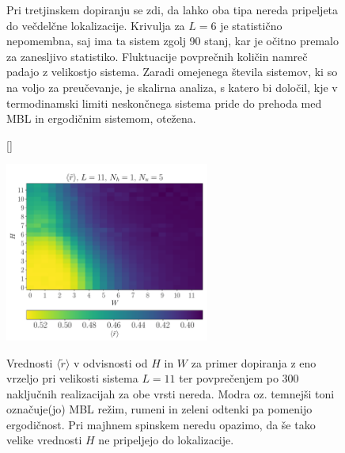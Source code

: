 \begin{figure}[H]
\caption{Pri tretjinskem dopiranju se zdi, da lahko oba tipa nereda pripeljeta do večdelčne lokalizacije. Krivulja za $L=6$ je statistično nepomembna, saj ima ta sistem zgolj 90 stanj, kar je očitno premalo za zanesljivo statistiko. Fluktuacije povprečnih količin namreč padajo z velikostjo sistema. Zaradi omejenega števila sistemov, ki so na voljo za preučevanje, je skalirna analiza, s katero bi določil, kje v termodinamski limiti neskončnega sistema pride do prehoda med MBL in ergodičnim sistemom, otežena.  }
\label{fig:double_plot_disorder_sym_break_12_4_4_slo}
\end{figure}
\begin{figure}[H]
[\FBwidth]
{\caption{Vrednosti $\langle \tilde{r}\rangle$ v odvisnosti od $H$ in $W$ za primer dopiranja z eno vrzeljo pri velikosti sistema $L=11$ ter povprečenjem po 300 naključnih realizacijah za obe vrsti nereda. Modra oz. temnejši toni označuje(jo) MBL režim, rumeni in zeleni odtenki pa pomenijo ergodičnost. Pri majhnem spinskem neredu opazimo, da še tako velike vrednosti $H$ ne pripeljejo do lokalizacije. }\label{fig:r_density_11_1_5}}
{\includegraphics[width=0.6\textwidth]{r_density_11_1_5.pdf}}
\end{figure}
